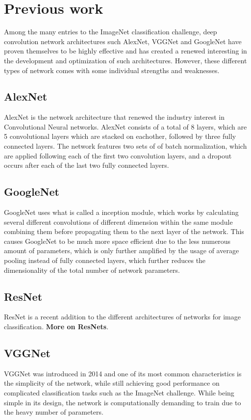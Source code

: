 \documentclass{kthreport}
\begin{document}
\section{Previous work}
Among the many entries to the ImageNet classification challenge, deep convolution network architectures such AlexNet, VGGNet and GoogleNet have proven themselves to be highly effective and has created a renewed interesting in the development and optimization of such architectures. However, these different types of network comes with some individual strengths and weaknesses.



\subsection{AlexNet}
AlexNet is the network architecture that renewed the industry interest in Convolutional Neural networks. AlexNet consists of a total of 8 layers, which are 5 convolutional layers which are stacked on eachother, followed by three fully connected layers. The network features two sets of of batch normalization, which are applied following each of the first two convolution layers, and a dropout occurs after each of the last two fully connected layers.
\subsection{GoogleNet}
GoogleNet uses what is called a inception module, which works by calculating several different convolutions of different dimension within the same module combining them before propagating them to the next layer of the network\cite{szegedy2016rethinking}. This causes GoogleNet to be much more space efficient due to the less numerous amount of parameters, which is only further amplified by the usage of average pooling instead of fully connected layers, which further reduces the dimensionality of the total number of network parameters.
\subsection{ResNet}
ResNet is a recent addition to the different architectures of networks for image classification. \textbf{More on ResNets}.


\subsection{VGGNet}
VGGNet was introduced in 2014 and one of its most common characteristics is the simplicity of the network, while still achieving good performance on complicated classification tasks such as the ImageNet challenge\cite{simonyan2014very}. While being simple in its design, the network is computationally demanding to train due to the heavy number of parameters.
\end{document}
